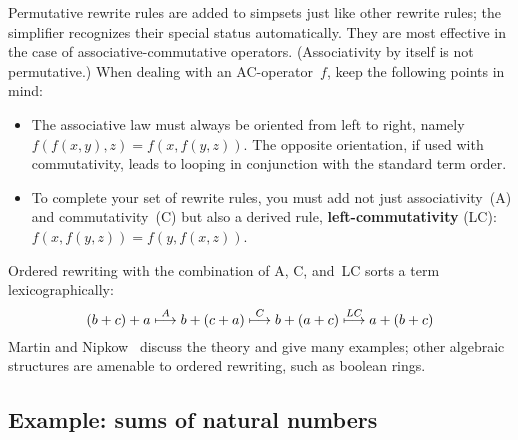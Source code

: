 Permutative rewrite rules are added to simpsets just like other
rewrite rules; the simplifier recognizes their special status
automatically.  They are most effective in the case of
associative-commutative operators.  (Associativity by itself is not
permutative.)  When dealing with an AC-operator~$f$, keep the
following points in mind:
\begin{itemize}
  
\item The associative law must always be oriented from left to right,
  namely $f(f(x,y),z) = f(x,f(y,z))$.  The opposite orientation, if
  used with commutativity, leads to looping in conjunction with the
  standard term order.

\item To complete your set of rewrite rules, you must add not just
  associativity~(A) and commutativity~(C) but also a derived rule, {\bf
    left-commutativity} (LC): $f(x,f(y,z)) = f(y,f(x,z))$.
\end{itemize}
Ordered rewriting with the combination of A, C, and~LC sorts a term
lexicographically:
\[\def\maps#1{\stackrel{#1}{\longmapsto}}
 (b+c)+a \maps{A} b+(c+a) \maps{C} b+(a+c) \maps{LC} a+(b+c) \]
Martin and Nipkow~\cite{martin-nipkow} discuss the theory and give many
examples; other algebraic structures are amenable to ordered rewriting,
such as boolean rings.

\subsection{Example: sums of natural numbers}

